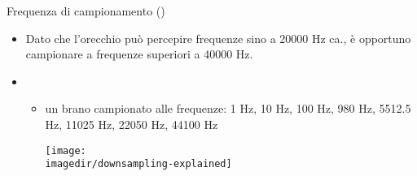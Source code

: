 \begin{slide}{{\small Frequenza di campionamento ()}}
{\scriptsize
	\begin{itemize}

		\item Dato che l'orecchio pu\`o percepire
			  frequenze sino a 20000 Hz ca.,
			  \`e opportuno campionare a frequenze superiori a 40000 Hz.

		\item {}

			\begin{itemize}

				\item un brano campionato alle frequenze:
                      1 Hz, 10 Hz, 100 Hz, 980 Hz, 
                      5512.5 Hz, 11025 Hz, 22050 Hz, 44100 Hz

					  \begin{center}
						\texttt{[image: \\imagedir/downsampling-explained]}
					  \end{center}
			\end{itemize}

	\end{itemize}
}
\end{slide}
